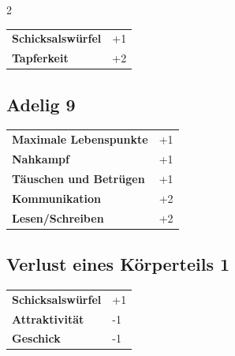 \begin{multicols}{2}
\begin{tcolorbox}
\begin{tabular}{@{}ll@{}}
    \textbf{Schicksalswürfel} & +1\\
    \textbf{Tapferkeit} & +2\\
\end{tabular}


\end{tcolorbox}

\begin{tcolorbox}
    \subsection*{Adelig \hfill \small{9 }}
    \tcblower




\begin{tabular}{@{}ll@{}}
    \textbf{Maximale Lebenspunkte} & +1\\
    \textbf{Nahkampf} & +1\\
    \textbf{Täuschen und Betrügen} & +1\\
    \textbf{Kommunikation} & +2\\
    \textbf{Lesen/Schreiben} & +2\\
\end{tabular}


\end{tcolorbox}

\begin{tcolorbox}
    \subsection*{Verlust eines Körperteils \hfill \small{1 }}
    \tcblower




\begin{tabular}{@{}ll@{}}
    \textbf{Schicksalswürfel} & +1\\
    \textbf{Attraktivität} & -1\\
    \textbf{Geschick} & -1\\
\end{tabular}



\end{tcolorbox}
\end{multicols}

